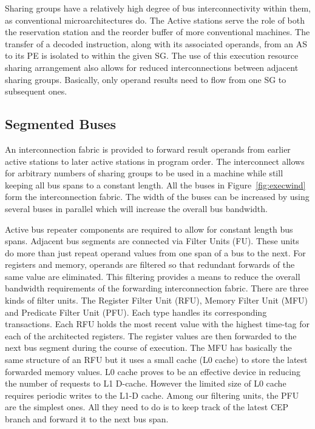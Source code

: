 \documentclass[10pt,twocolumn]{IEEEtran}
\begin{document}
Sharing groups have a relatively high degree of bus interconnectivity
within them, as conventional microarchitectures do. The Active stations
serve the role of both the reservation station and the reorder buffer
of more conventional machines. The transfer of a decoded instruction,
along with its associated operands, from an AS to its PE is isolated to
within the given SG. The use of this execution resource sharing
arrangement also allows for reduced interconnections between adjacent
sharing groups. Basically, only operand results need to flow from one
SG to subsequent ones.

\subsection {Segmented Buses}

An interconnection fabric is provided to forward result operands from
earlier active stations to later active stations in program order.  The
interconnect allows for arbitrary numbers of sharing groups to be used
in a machine while still keeping all bus spans to a constant length.
All the buses in Figure~\ref{fig:execwind} form the interconnection
fabric.  The width of the buses can be increased by using several buses
in parallel which will increase the overall bus bandwidth.

Active bus repeater components are required to allow for constant
length bus spans.  Adjacent bus segments are connected via Filter Units
(FU).  These units do more than just repeat operand values from one
span of a bus to the next.  For registers and  memory, operands are
filtered so that redundant forwards of the same value are eliminated.
This filtering provides a means to reduce the overall bandwidth
requirements of the forwarding interconnection fabric.  There are three
kinds of filter units.  The Register Filter Unit (RFU), Memory Filter
Unit (MFU) and Predicate Filter Unit (PFU).  Each type handles its
corresponding transactions.  Each RFU holds the most recent value with
the highest time-tag for each of the architected registers.  The
register values are then forwarded to the next bus segment during the
course of execution.
The MFU has basically the same structure of an RFU but it uses a small
cache (L0 cache) to store the latest forwarded memory values.  L0
cache proves to be an effective device in reducing the number of
requests to L1 D-cache.  However the limited size of L0 cache requires
periodic writes to the L1-D cache.  Among our filtering units, the PFU
are the simplest ones.  All they need to do is to keep track of the
latest CEP branch and forward it to the next bus span.
\end{document}
